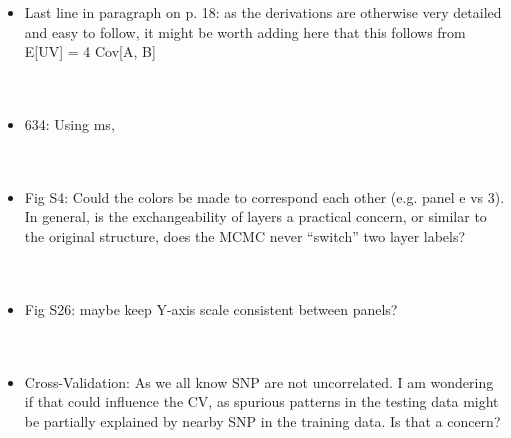 \documentclass[11pt]{letter}
\newcommand{\gb}[1]{{\bf\color{black}{#1}}}
\begin{document}
\begin{itemize}
\item Last line in paragraph on p. 18: as the derivations are otherwise very detailed and easy to follow, it might be worth adding here that this follows from E[UV] = 4 Cov[A, B]\\\\
\gb{}\\

\item 634: Using ms,
\\\\
\gb{Fixed.}\\

\item Fig S4: Could the colors be made to correspond each other (e.g. panel e vs 3). In general, is the exchangeability of layers a practical concern, or similar to the original structure, does the MCMC never ``switch'' two layer labels?\\\\
\gb{shoutout label-switching }\\

\item Fig S26: maybe keep Y-axis scale consistent between panels?\\\\
\gb{}\\

\item Cross-Validation: As we all know SNP are not uncorrelated. I am wondering if that could influence the CV, as spurious patterns in the testing data might be partially explained by nearby SNP in the training data. Is that a concern?\\\\
\gb{shoutout about df of the Wish for CV, should sample SNPs in blocks}\\

\end{itemize}
\end{document}
